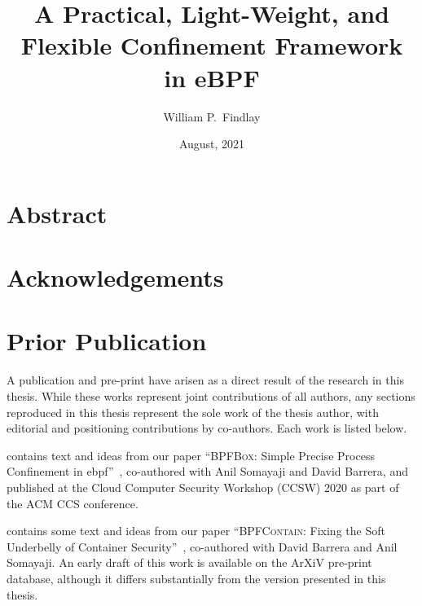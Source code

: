 \documentclass[
  fontsize=12pt,
  titlepage=firstiscover,
  paper=letter,
  oneside,
  cleardoublepage=plain,
  parskip=half-,
  DIV=10,
  parindent,
  appendixprefix,
  chapterprefix,
  listof=totoc,
]{scrbook}
\title{A Practical, Light-Weight, and Flexible Confinement Framework in eBPF}
\author{William P.~Findlay}
\date{August, 2021}
\newcommand{\bpfbox}{\textsc{BPFBox}}
\newcommand{\bpfcontain}{\textsc{BPFContain}}
\begin{document}



\frontmatter%


\chapter*{Abstract}%
%
\cleardoublepage%

\chapter*{Acknowledgements}%
%
\cleardoublepage%

\chapter*{Prior Publication}%
%
A publication and pre-print have arisen as a direct result of the research in this thesis.
While these works represent joint contributions of all authors, any sections reproduced in
this thesis represent the sole work of the thesis author, with editorial and positioning
contributions by co-authors. Each work is listed below.

 contains text and ideas from our paper \enquote{\bpfbox{}: Simple Precise
Process Confinement in \gls{ebpf}}~\cite{findlay2020_bpfbox}, co-authored with Anil
Somayaji and David Barrera, and published at the Cloud Computer Security Workshop (CCSW)
2020 as part of the ACM CCS conference.

 contains some text and ideas from our paper \enquote{\bpfcontain{}:
Fixing the Soft Underbelly of Container Security}~\cite{findlay2021_bpfcontain},
co-authored with David Barrera and Anil Somayaji. An early draft of this work is available
on the ArXiV pre-print database, although it differs substantially from the version
presented in this thesis.
\cleardoublepage%
\end{document}
